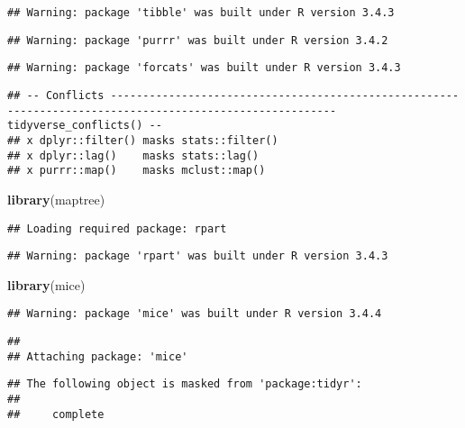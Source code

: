 \documentclass[]{article}
\newenvironment{Shaded}{\begin{snugshade}}{\end{snugshade}}
\newcommand{\KeywordTok}[1]{\textcolor[rgb]{0.13,0.29,0.53}{\textbf{#1}}}
\newcommand{\NormalTok}[1]{#1}
\begin{document}
\begin{verbatim}
## Warning: package 'tibble' was built under R version 3.4.3
\end{verbatim}

\begin{verbatim}
## Warning: package 'purrr' was built under R version 3.4.2
\end{verbatim}

\begin{verbatim}
## Warning: package 'forcats' was built under R version 3.4.3
\end{verbatim}

\begin{verbatim}
## -- Conflicts --------------------------------------------------------------------------------------------------------- tidyverse_conflicts() --
## x dplyr::filter() masks stats::filter()
## x dplyr::lag()    masks stats::lag()
## x purrr::map()    masks mclust::map()
\end{verbatim}

\begin{Shaded}
\begin{Highlighting}[]
\KeywordTok{library}\NormalTok{(maptree)}
\end{Highlighting}
\end{Shaded}

\begin{verbatim}
## Loading required package: rpart
\end{verbatim}

\begin{verbatim}
## Warning: package 'rpart' was built under R version 3.4.3
\end{verbatim}

\begin{Shaded}
\begin{Highlighting}[]
\KeywordTok{library}\NormalTok{(mice)}
\end{Highlighting}
\end{Shaded}

\begin{verbatim}
## Warning: package 'mice' was built under R version 3.4.4
\end{verbatim}

\begin{verbatim}
## 
## Attaching package: 'mice'
\end{verbatim}

\begin{verbatim}
## The following object is masked from 'package:tidyr':
## 
##     complete
\end{verbatim}
\end{document}
